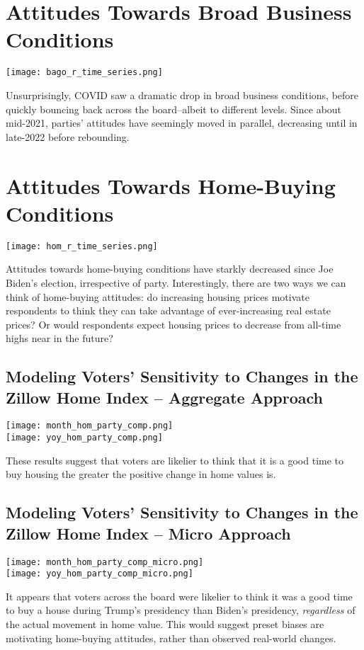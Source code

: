 \documentclass{article}
\begin{document}
\section{Attitudes Towards Broad Business Conditions}
\centering \texttt{[image: bago\_r\_time\_series.png]}\\
\raggedright Unsurprisingly, COVID saw a dramatic drop in broad business conditions, before quickly bouncing back across the board--albeit to different levels. Since about mid-2021, parties' attitudes have seemingly moved in parallel, decreasing until in late-2022 before rebounding. 

\section{Attitudes Towards Home-Buying Conditions}
\centering \texttt{[image: hom\_r\_time\_series.png]}\\
\raggedright Attitudes towards home-buying conditions have starkly decreased since Joe Biden's election, irrespective of party. Interestingly, there are two ways we can think of home-buying attitudes: do increasing housing prices motivate respondents to think they can take advantage of ever-increasing real estate prices? Or would respondents expect housing prices to decrease from all-time highs near in the future? 

\subsection{Modeling Voters' Sensitivity to Changes in the Zillow Home Index -- Aggregate Approach}
\centering \texttt{[image: month\_hom\_party\_comp.png]} \\
\texttt{[image: yoy\_hom\_party\_comp.png]} \\
\raggedright These results suggest that voters are likelier to think that it is a good time to buy housing the greater the positive change in home values is. 

\subsection{Modeling Voters' Sensitivity to Changes in the Zillow Home Index -- Micro Approach}
\centering \texttt{[image: month\_hom\_party\_comp\_micro.png]} \\
\texttt{[image: yoy\_hom\_party\_comp\_micro.png]} \\
\raggedright It appears that voters across the board were likelier to think it was a good time to buy a house during Trump's presidency than Biden's presidency, \textit{regardless} of the actual movement in home value. This would suggest preset biases are motivating home-buying attitudes, rather than observed real-world changes.
\end{document}
